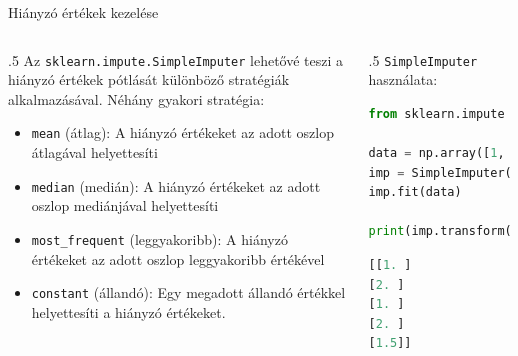 \documentclass[english, aspectratio=169]{beamer}
\begin{document}
	\begin{frame}[fragile]{Hiányzó értékek kezelése}
		\begin{columns}
			\begin{column}{.5\textwidth}
				Az \texttt{sklearn.impute.SimpleImputer} lehetővé teszi a hiányzó értékek pótlását különböző stratégiák alkalmazásával. Néhány gyakori stratégia:
				\begin{itemize}
					\item \texttt{mean} (átlag): A hiányzó értékeket az adott oszlop átlagával helyettesíti
					\item \texttt{median} (medián): A hiányzó értékeket az adott oszlop mediánjával helyettesíti
					\item \texttt{most\_frequent} (leggyakoribb): A hiányzó értékeket az adott oszlop leggyakoribb értékével
					\item \texttt{constant} (állandó): Egy megadott állandó értékkel helyettesíti a hiányzó értékeket.
				\end{itemize}			
			\end{column}
			\begin{column}{.5\textwidth}
				\texttt{SimpleImputer}  használata:
				\begin{lstlisting}[language=python]
from sklearn.impute import SimpleImputer

data = np.array([1, 2, 1, 2, np.nan]).reshape(-1, 1)
imp = SimpleImputer(strategy='mean')
imp.fit(data)

print(imp.transform(data))
				\end{lstlisting}
				\begin{lstlisting}[language=python]
[[1. ]
[2. ]
[1. ]
[2. ]
[1.5]]
				\end{lstlisting}
			\end{column}
		\end{columns}
	\end{frame}
	
\end{document}
